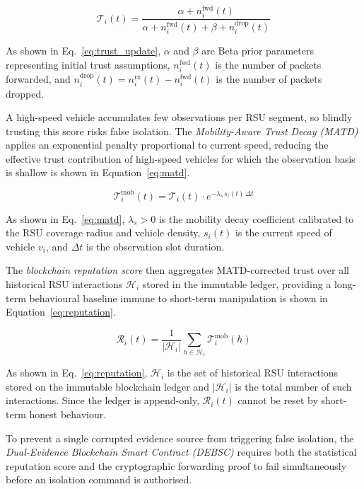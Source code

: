 \documentclass[12pt, a4paper]{report}
\begin{document}
\begin{equation}
\label{eq:trust_update}
\mathcal{T}_i(t) = \frac{\alpha + n_i^{\text{fwd}}(t)}
                         {\alpha + n_i^{\text{fwd}}(t)
                          + \beta + n_i^{\text{drop}}(t)}
\end{equation}

As shown in Eq.~\eqref{eq:trust_update}, $\alpha$ and $\beta$ are 
Beta prior parameters representing initial trust assumptions, 
$n_i^{\text{fwd}}(t)$ is the number of packets forwarded, and 
$n_i^{\text{drop}}(t) = n_i^{\text{rx}}(t) - n_i^{\text{fwd}}(t)$ 
is the number of packets dropped.

A high-speed vehicle accumulates few observations per RSU segment, so blindly
trusting this score risks false isolation. The \emph{Mobility-Aware Trust
Decay (MATD)} applies an exponential penalty proportional to current speed,
reducing the effective trust contribution of high-speed vehicles for which
the observation basis is shallow is shown in Equation~\eqref{eq:matd}.

\begin{equation}
\label{eq:matd}
\mathcal{T}_i^{\text{mob}}(t) = \mathcal{T}_i(t) \cdot
e^{-\lambda_s\, s_i(t)\, \Delta t}
\end{equation}

As shown in Eq.~\eqref{eq:matd}, $\lambda_s > 0$ is the mobility 
decay coefficient calibrated to the RSU coverage radius and vehicle 
density, $s_i(t)$ is the current speed of vehicle $v_i$, and 
$\Delta t$ is the observation slot duration.

 The \emph{blockchain reputation
score} then aggregates MATD-corrected trust over all historical RSU interactions
$\mathcal{H}_i$ stored in the immutable ledger, providing a long-term behavioural
baseline immune to short-term manipulation is shown in Equation~\eqref{eq:reputation}.

\begin{equation}
\label{eq:reputation}
\mathcal{R}_i(t) = \frac{1}{|\mathcal{H}_i|}
\sum_{h \in \mathcal{H}_i} \mathcal{T}_i^{\text{mob}}(h)
\end{equation}

As shown in Eq.~\eqref{eq:reputation}, $\mathcal{H}_i$ is the set 
of historical RSU interactions stored on the immutable blockchain 
ledger and $|\mathcal{H}_i|$ is the total number of such interactions. 
Since the ledger is append-only, $\mathcal{R}_i(t)$ cannot be reset 
by short-term honest behaviour.

To prevent a single corrupted evidence source from triggering false
isolation, the \emph{Dual-Evidence Blockchain Smart Contract (DEBSC)}
requires both the statistical reputation score and the cryptographic
forwarding proof to fail simultaneously before an isolation command
is authorised.
\end{document}
